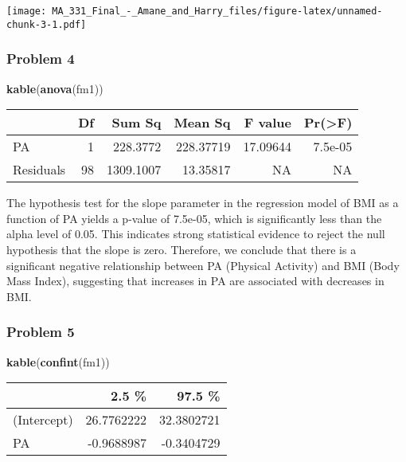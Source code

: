 \documentclass[
]{article}
\newenvironment{Shaded}{\begin{snugshade}}{\end{snugshade}}
\newcommand{\FunctionTok}[1]{\textcolor[rgb]{0.13,0.29,0.53}{\textbf{#1}}}
\newcommand{\NormalTok}[1]{#1}
\begin{document}
\texttt{[image: MA\_331\_Final\_-\_Amane\_and\_Harry\_files/figure-latex/unnamed-chunk-3-1.pdf]}

\hypertarget{problem-4}{%
\subsubsection{Problem 4}\label{problem-4}}

\begin{Shaded}
\begin{Highlighting}[]
\FunctionTok{kable}\NormalTok{(}\FunctionTok{anova}\NormalTok{(fm1))}
\end{Highlighting}
\end{Shaded}

\begin{longtable}[]{@{}lrrrrr@{}}
\toprule\noalign{}
& Df & Sum Sq & Mean Sq & F value & Pr(\textgreater F) \\
\midrule\noalign{}
\endhead
\bottomrule\noalign{}
\endlastfoot
PA & 1 & 228.3772 & 228.37719 & 17.09644 & 7.5e-05 \\
Residuals & 98 & 1309.1007 & 13.35817 & NA & NA \\
\end{longtable}

The hypothesis test for the slope parameter in the regression model of
BMI as a function of PA yields a p-value of 7.5e-05, which is
significantly less than the alpha level of 0.05. This indicates strong
statistical evidence to reject the null hypothesis that the slope is
zero. Therefore, we conclude that there is a significant negative
relationship between PA (Physical Activity) and BMI (Body Mass Index),
suggesting that increases in PA are associated with decreases in BMI.

\hypertarget{problem-5}{%
\subsubsection{Problem 5}\label{problem-5}}

\begin{Shaded}
\begin{Highlighting}[]
\FunctionTok{kable}\NormalTok{(}\FunctionTok{confint}\NormalTok{(fm1))}
\end{Highlighting}
\end{Shaded}

\begin{longtable}[]{@{}lrr@{}}
\toprule\noalign{}
& 2.5 \% & 97.5 \% \\
\midrule\noalign{}
\endhead
\bottomrule\noalign{}
\endlastfoot
(Intercept) & 26.7762222 & 32.3802721 \\
PA & -0.9688987 & -0.3404729 \\
\end{longtable}
\end{document}
